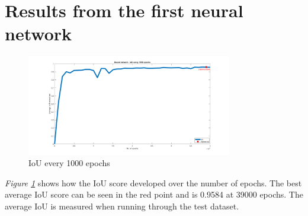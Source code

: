 \section{Results from the first neural network}
\begin{figure}[h]
    \centering
    \includegraphics[width=0.8\textwidth, trim={5cm 0 4cm 0},clip]{graphics/results/neuralnetworkauto.png}
    \caption{IoU every 1000 epochs}
    \label{fig:neuralnetwork}
\end{figure}
\textit{Figure \ref{fig:neuralnetwork}} shows how the IoU score developed over the number of epochs. The best average IoU score can be seen in the red point and is 0.9584 at 39000 epochs. The average IoU is measured when running through the test dataset.

